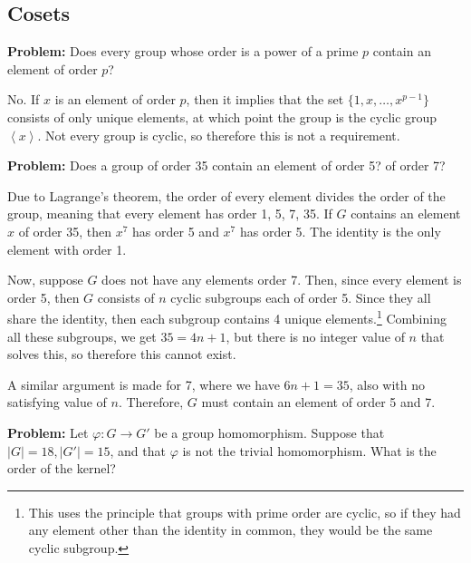 \documentclass[10pt]{article}
\newenvironment{problem}{\textbf{Problem:}}{}
\begin{document}
\subsection{Cosets}
\begin{problem}
	Does every group whose order is a power of a prime \( p \) contain 
	an element of order \( p \)? 
\end{problem}

\begin{solution}
	No. If \( x \) is an element of order \( p \), then it implies that 
	the set \( \{1, x, \dots, x^{p - 1}\}  \) consists of only unique 
	elements, at which point the group is the cyclic group \( \left< x \right> \). 
	Not every group is cyclic, so therefore this is not a requirement. 
\end{solution}

\begin{problem}
	Does a group of order 35 contain an element of order 5? of order 7?
\end{problem}

\begin{solution}
	Due to Lagrange's theorem, the order of every element divides the order of the 
	group, meaning that every element has order 1, 5, 7, 35. If \( G \) contains 
	an element \( x \) of order 35, then \( x^{7}  \) has order 5 and 
	\( x^{7} \) has order 5. The identity is the only element with order 1. 

	Now, suppose \( G \) does not have any elements order 7. Then, since every 
	element is order 5, then \( G \) consists of \( n \) cyclic subgroups 
	each of order 5. Since they all share the identity, then each subgroup contains 
	4 unique elements.\footnote{This uses the principle that groups with prime 
		order are cyclic, so if they had any element other than the identity in common,
	they would be the same cyclic subgroup.}
	Combining all these subgroups, we get \( 35 = 4n + 1 \), but 
	there is no integer value of \( n \) that solves this, so therefore 
	this cannot exist. 

	A similar argument is made for 7, where we have \( 6n + 1 = 35 \), also with 
	no satisfying value of \( n \). Therefore, \( G \) must contain 
	an element of order 5 and 7. 
\end{solution}

\begin{problem}
	Let \( \varphi: G \to G' \) be a group homomorphism. Suppose that 
	\( |G| = 18, |G'| = 15 \), and that \( \varphi \) is not the trivial homomorphism.
	What is the order of the kernel?
\end{problem}
\end{document}

